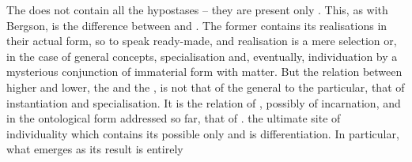 The  does not  contain all the hypostases -- they are
present only .  This, as with Bergson, is the difference between
 and .  The former contains its realisations in
their actual form, so to speak ready-made, and realisation is a mere selection
or, in the case of general concepts, specialisation and, eventually,
individuation by a mysterious conjunction of immaterial form with matter.  But
the relation between higher and lower, the  and the ,
is not that of the general to the particular, that of instantiation and
specialisation. It is the relation of , possibly of incarnation,
and in the ontological form addressed so far, that of .
  the ultimate site of individuality which 
contains its possible  only  and  is
differentiation.  In particular, what emerges as its result is entirely
